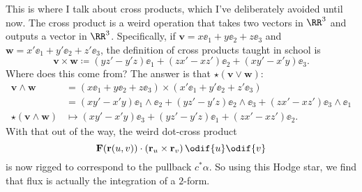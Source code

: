 \begin{itemize}
	This is where I talk about cross products, which I've deliberately avoided until now.
	The cross product is a weird operation that takes two vectors in $\RR^3$
	and outputs a vector in $\RR^3$.
	Specifically, if $\mathbf{v} = x \ee_1 + y \ee_2 + z \ee_3$
	and $\mathbf{w} = x' \ee_1 + y' \ee_2 + z' \ee_3$,
	the definition of cross products taught in school is
	\[ \mathbf{v} \times \mathbf{w} \coloneq (yz'-y'z) \ee_1 + (zx'-xz') \ee_2 + (xy'-x'y) \ee_3. \]
	Where does this come from?
	The answer is that $\star(\mathbf{v} \vee \mathbf{w})$:
	\begin{align*}
		\mathbf{v} \wedge \mathbf{w} &=
		(x \ee_1 + y \ee_2 + z \ee_3) \times (x' \ee_1 + y' \ee_2 + z' \ee_3) \\
		&= (xy'-x'y) \ee_1 \wedge \ee_2
		+ (yz'-y'z) \ee_2 \wedge \ee_3
		+ (zx'-xz') \ee_3 \wedge \ee_1 \\
		\star(\mathbf{v} \wedge \mathbf{w})
		&\mapsto (xy'-x'y) \ee_3
		+ (yz'-y'z) \ee_1
		+ (zx'-xz') \ee_2.
	\end{align*}
	With that out of the way, the weird dot-cross product
	\[ \mathbf{F}(\mathbf{r}(u,v)) \cdot \left( \mathbf{r}_u \times \mathbf{r}_v \right) \odif{u} \odif{v} \]
	is now rigged to correspond to the pullback $c^\ast\alpha$.
	So using this Hodge star, we find that flux is actually the integration of a $2$-form.
\end{itemize}

